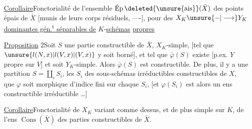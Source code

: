 \uline{Corollaire}\quad Fonctorialité  de l'ensemble $\operatorname{\text{Ép}}\deleted{\unsure{\mathrm{ais}}}(\bar X)$ des points  épais de $\bar X$ [munis de leurs corps résiduels, ----], pour des  $X_K\unsure{\mathord{-}|\longrightarrow}Y_K$ \uline{dominantes gén.\textsuperscript{t} séparables de} $K$-\uline{schémas} \uline{propres}

\uline{Proposition} 2\quad Soit $S$ une partie constructible de $\bar X$, $X_K$-simple, [tel que $\unsure{l(N,x)|l(V,x)|(V,x)}$ y soit borné], et tel que $\bar\varphi(S)$ existe [p.ex. $Y$ propre sur $V$] et soit $Y_K$-simple. Alors $\bar\varphi(S)$ est constructible. De plus, il y a une partition  $S=\coprod_i S_i$, les $S_i$ des sous-schémas irréductibles constructibles de $X$,  que $\varphi$ soit morphique d'indice fini sur chaque $S_i$, [et $\varphi(S_i)$ est alors un ens constructible irréductible \ldots]

\uline{Corollaire}\quad Fonctorialité de $X_K$ variant comme dessus, et de plus simple sur $K$, de l'ens $\operatorname{Cons}(\bar X)$ des parties constructibles de $\bar X$.
